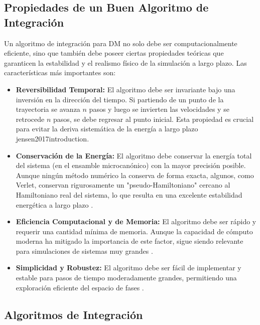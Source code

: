 \subsection{Propiedades de un Buen Algoritmo de Integración}

Un algoritmo de integración para DM no solo debe ser computacionalmente eficiente, sino que también debe poseer ciertas propiedades teóricas que garanticen la estabilidad y el realismo físico de la simulación a largo plazo. Las características más importantes son:

\begin{itemize}
    \item \textbf{Reversibilidad Temporal:} El algoritmo debe ser invariante bajo una inversión en la dirección del tiempo. Si partiendo de un punto de la trayectoria se avanza $n$ pasos y luego se invierten las velocidades y se retrocede $n$ pasos, se debe regresar al punto inicial. Esta propiedad es crucial para evitar la deriva sistemática de la energía a largo plazo \cite[e122,452]{frenkel2002understanding}{jensen2017introduction}.
    
    \item \textbf{Conservación de la Energía:} El algoritmo debe conservar la energía total del sistema (en el ensamble microcanónico) con la mayor precisión posible. Aunque ningún método numérico la conserva de forma exacta, algunos, como Verlet, conservan rigurosamente un "pseudo-Hamiltoniano" cercano al Hamiltoniano real del sistema, lo que resulta en una excelente estabilidad energética a largo plazo \cite[112]{frenkel2002understanding}.
    
    \item \textbf{Eficiencia Computacional y de Memoria:} El algoritmo debe ser rápido y requerir una cantidad mínima de memoria. Aunque la capacidad de cómputo moderna ha mitigado la importancia de este factor, sigue siendo relevante para simulaciones de sistemas muy grandes \cite[112]{frenkel2002understanding}.
    
    \item \textbf{Simplicidad y Robustez:} El algoritmo debe ser fácil de implementar y estable para pasos de tiempo moderadamente grandes, permitiendo una exploración eficiente del espacio de fases \cite[176]{haile1992molecular}.
\end{itemize}

\subsection{Algoritmos de Integración}

